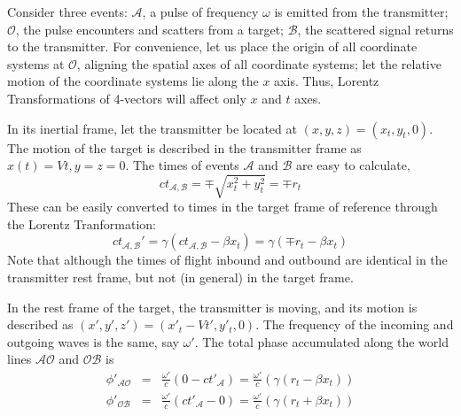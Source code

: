 Consider three events: $\mathcal{A}$, a pulse of frequency $\omega$ is
emitted from the transmitter; $\mathcal{O}$, the pulse encounters and
scatters from a target; $\mathcal{B}$, the scattered signal returns to
the transmitter.  For convenience, let us place the origin of all
coordinate systems at $\mathcal{O}$, aligning the spatial axes of all
coordinate systems; let the relative motion of the coordinate systems
lie along the $x$ axis.  Thus, Lorentz Transformations of 4-vectors
will affect only $x$ and $t$ axes.

In its inertial frame, let the transmitter be located at $(x,y,z) =
(x_t, y_t, 0)$.  The motion of the target is described in the
transmitter frame as $x(t) = Vt, y = z = 0$.  The times of events
$\mathcal{A}$ and $\mathcal{B}$ are easy to calculate,
\begin{equation} \label{e:relativity1}
ct_{\mathcal{A},\mathcal{B}} = \mp \sqrt{x_t^2 + y_t^2} = \mp r_t
\end{equation}
These can be easily converted to times in the target frame of
reference through the Lorentz Tranformation:
\begin{equation} \label{e:relativity2}
ct_{\mathcal{A},\mathcal{B}}' = 
  \gamma (ct_{\mathcal{A},\mathcal{B}} - \beta x_t) =
  \gamma (\mp r_t - \beta x_t)
\end{equation}
Note that although the times of flight inbound and outbound are
identical in the transmitter rest frame, but not (in general) in the
target frame.

In the rest frame of the target, the transmitter is moving, and its
motion is described as $(x', y', z') = (x'_t - Vt', y'_t, 0)$.  The
frequency of the incoming and outgoing waves is the same, say
$\omega'$.  The total phase accumulated along the world lines
$\mathcal{AO}$ and $\mathcal{OB}$ is
\begin{eqnarray}
\phi'_{\mathcal{AO}} &=& 
 \frac{\omega'}{c}\left(0 - ct'_\mathcal{A}\right) = 
 \frac{\omega'}{c}\left(\gamma(r_t - \beta x_t)\right) \\
\phi'_{\mathcal{OB}} &=& 
 \frac{\omega'}{c}\left(ct'_\mathcal{A} - 0\right) = 
 \frac{\omega'}{c}\left(\gamma(r_t + \beta x_t)\right)
\end{eqnarray}

